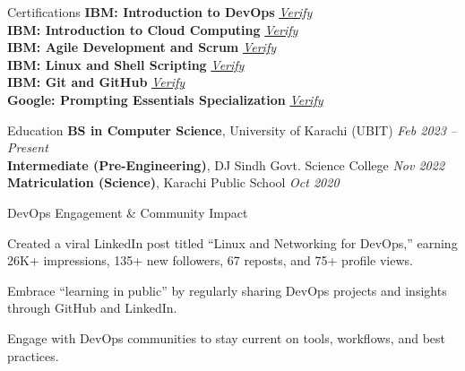 \documentclass{resume}
\begin{document}
\begin{rSection}{Certifications}
\textbf{IBM: Introduction to DevOps} \hfill \href{https://www.coursera.org/account/accomplishments/verify/OIGBYO6L8GZJ}{\textit{Verify}} \\
\textbf{IBM: Introduction to Cloud Computing} \hfill \href{https://www.coursera.org/account/accomplishments/verify/O4EN4P7ZI6XV}{\textit{Verify}} \\
\textbf{IBM: Agile Development and Scrum} \hfill \href{https://www.coursera.org/account/accomplishments/verify/PV26WR8KH5MX}{\textit{Verify}} \\
\textbf{IBM: Linux and Shell Scripting} \hfill \href{https://www.coursera.org/account/accomplishments/verify/07JX8O7ZPDCY}{\textit{Verify}} \\
\textbf{IBM: Git and GitHub} \hfill \href{https://www.coursera.org/account/accomplishments/verify/6JZJJTDRFPBT}{\textit{Verify}} \\
\textbf{Google: Prompting Essentials Specialization} \hfill \href{https://www.coursera.org/account/accomplishments/specialization/Y6K56SVG21W2}{\textit{Verify}}
\end{rSection}

\begin{rSection}{Education}
\textbf{BS in Computer Science}, University of Karachi (UBIT) \hfill \textit{Feb 2023 -- Present} \\
\textbf{Intermediate (Pre-Engineering)}, DJ Sindh Govt. Science College \hfill \textit{Nov 2022} \\
\textbf{Matriculation (Science)}, Karachi Public School \hfill \textit{Oct 2020}
\end{rSection}

\begin{rSection}{DevOps Engagement \& Community Impact}
\item Created a viral LinkedIn post titled “Linux and Networking for DevOps,” earning 26K+ impressions, 135+ new followers, 67 reposts, and 75+ profile views.
\item Embrace “learning in public” by regularly sharing DevOps projects and insights through GitHub and LinkedIn.
\item Engage with DevOps communities to stay current on tools, workflows, and best practices.
\end{rSection}
\end{document}
